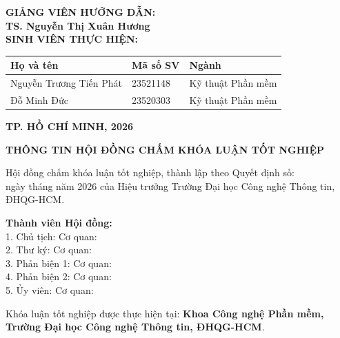 \documentclass[12pt,a4paper]{report}
\begin{document}
\begin{titlepage}
\begin{center}
        \vspace{1cm}

        \begin{minipage}{11cm}
            \large
            \textbf{GIẢNG VIÊN HƯỚNG DẪN:}\\[0.1cm]
            \textbf{TS. Nguyễn Thị Xuân Hương}\\[0.4cm]
            \textbf{SINH VIÊN THỰC HIỆN:}\\[0.2cm]
            \normalsize
            \begin{tabular}{|l|l|l|}
                \hline
                \textbf{Họ và tên} & \textbf{Mã số SV} & \textbf{Ngành} \\ \hline
                Nguyễn Trương Tiến Phát & 23521148 & Kỹ thuật Phần mềm \\ \hline
                Đỗ Minh Đức & 23520303 & Kỹ thuật Phần mềm \\ \hline
            \end{tabular}
        \end{minipage}

        \vfill

        \normalsize
        \textbf{TP. HỒ CHÍ MINH, 2026}
    \end{center}
\end{titlepage}

\newpage
\thispagestyle{empty}
\begin{center}
    \large \textbf{THÔNG TIN HỘI ĐỒNG CHẤM KHÓA LUẬN TỐT NGHIỆP}
\end{center}
\vspace{1cm}
Hội đồng chấm khóa luận tốt nghiệp, thành lập theo Quyết định số: \dotfill \\
ngày \dotfill tháng \dotfill năm 2026 của Hiệu trưởng Trường Đại học Công nghệ Thông tin, ĐHQG-HCM.

\vspace{0.8cm}
\noindent\textbf{Thành viên Hội đồng:}\\[0.3cm]
1. Chủ tịch: \dotfill Cơ quan: \dotfill \\[0.2cm]
2. Thư ký: \dotfill Cơ quan: \dotfill \\[0.2cm]
3. Phản biện 1: \dotfill Cơ quan: \dotfill \\[0.2cm]
4. Phản biện 2: \dotfill Cơ quan: \dotfill \\[0.2cm]
5. Ủy viên: \dotfill Cơ quan: \dotfill

\vspace{1.5cm}
\noindent Khóa luận tốt nghiệp được thực hiện tại: \textbf{Khoa Công nghệ Phần mềm, Trường Đại học Công nghệ Thông tin, ĐHQG-HCM}.
\end{document}
